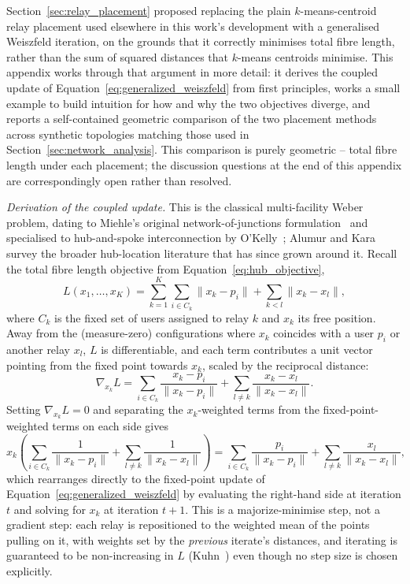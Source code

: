 \documentclass[12pt]{article}
\begin{document}
Section~\ref{sec:relay_placement} proposed replacing the plain $k$-means-centroid relay placement used elsewhere in this work's development with a generalised Weiszfeld iteration, on the grounds that it correctly minimises total fibre length, rather than the sum of squared distances that $k$-means centroids minimise. This appendix works through that argument in more detail: it derives the coupled update of Equation~\ref{eq:generalized_weiszfeld} from first principles, works a small example to build intuition for how and why the two objectives diverge, and reports a self-contained geometric comparison of the two placement methods across synthetic topologies matching those used in Section~\ref{sec:network_analysis}. This comparison is purely geometric -- total fibre length under each placement; the discussion questions at the end of this appendix are correspondingly open rather than resolved.

\textit{Derivation of the coupled update.} This is the classical multi-facility Weber problem, dating to Miehle's original network-of-junctions formulation~\cite{Miehle_1958} and specialised to hub-and-spoke interconnection by O'Kelly~\cite{OKelly_1986}; Alumur and Kara~\cite{Alumur_2008} survey the broader hub-location literature that has since grown around it. Recall the total fibre length objective from Equation~\ref{eq:hub_objective},
$$
L(x_1,\dots,x_K) = \sum_{k=1}^{K}\sum_{i \in C_k} \|x_k - p_i\| + \sum_{k<l} \|x_k - x_l\|,
$$
where $C_k$ is the fixed set of users assigned to relay $k$ and $x_k$ its free position. Away from the (measure-zero) configurations where $x_k$ coincides with a user $p_i$ or another relay $x_l$, $L$ is differentiable, and each term contributes a unit vector pointing from the fixed point towards $x_k$, scaled by the reciprocal distance:
$$
\nabla_{x_k} L = \sum_{i \in C_k} \frac{x_k - p_i}{\|x_k - p_i\|} + \sum_{l \neq k} \frac{x_k - x_l}{\|x_k - x_l\|}.
$$
Setting $\nabla_{x_k} L = 0$ and separating the $x_k$-weighted terms from the fixed-point-weighted terms on each side gives
$$
x_k \left(\sum_{i \in C_k} \frac{1}{\|x_k - p_i\|} + \sum_{l \neq k} \frac{1}{\|x_k - x_l\|}\right) = \sum_{i \in C_k} \frac{p_i}{\|x_k - p_i\|} + \sum_{l \neq k} \frac{x_l}{\|x_k - x_l\|},
$$
which rearranges directly to the fixed-point update of Equation~\ref{eq:generalized_weiszfeld} by evaluating the right-hand side at iteration $t$ and solving for $x_k$ at iteration $t+1$. This is a majorize-minimise step, not a gradient step: each relay is repositioned to the weighted mean of the points pulling on it, with weights set by the \emph{previous} iterate's distances, and iterating is guaranteed to be non-increasing in $L$ (Kuhn~\cite{Kuhn_1973}) even though no step size is chosen explicitly.
\end{document}
